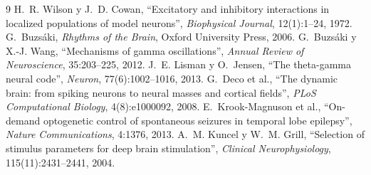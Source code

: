 \documentclass[11pt,a4paper]{article}
\begin{document}
\begin{thebibliography}{9}
H.~R. Wilson y J.~D. Cowan, ``Excitatory and inhibitory interactions in localized
populations of model neurons'', \emph{Biophysical Journal}, 12(1):1--24, 1972.
G.~Buzsáki, \emph{Rhythms of the Brain}, Oxford University Press, 2006.
G.~Buzsáki y X.-J. Wang, ``Mechanisms of gamma oscillations'', \emph{Annual Review of
Neuroscience}, 35:203--225, 2012.
J.~E. Lisman y O.~Jensen, ``The theta-gamma neural code'', \emph{Neuron},
77(6):1002--1016, 2013.
G.~Deco et al., ``The dynamic brain: from spiking neurons to neural masses and cortical
fields'', \emph{PLoS Computational Biology}, 4(8):e1000092, 2008.
E.~Krook-Magnuson et al., ``On-demand optogenetic control of spontaneous seizures in
temporal lobe epilepsy'', \emph{Nature Communications}, 4:1376, 2013.
A.~M. Kuncel y W.~M. Grill, ``Selection of stimulus parameters for deep brain
stimulation'', \emph{Clinical Neurophysiology}, 115(11):2431--2441, 2004.
\end{thebibliography}
\end{document}
